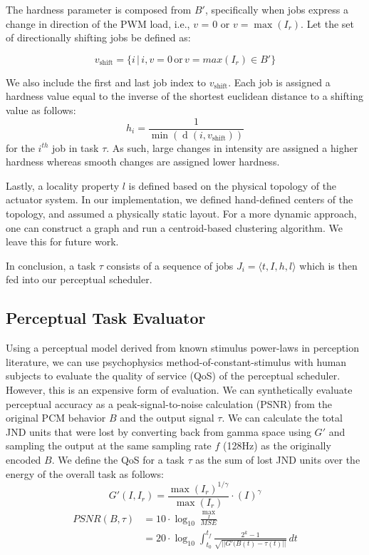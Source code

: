 \documentclass{sigchi}
\DeclareMathOperator{\dis}{d}
\begin{document}
    The hardness parameter is composed from $B'$, specifically when jobs express a change in direction of the PWM load, i.e., $v$ = 0 or $v = \max(I_r)$. Let the set of directionally shifting jobs be defined as:

    $$v_\text{shift} = \{ i \,\vert \,i, v = 0 \,\text{or} \, v = max(I_r) \in B'\}$$ 

    We also include the first and last job index to $v_\text{shift}$. Each job is assigned a hardness value equal to the inverse of the shortest euclidean distance to a shifting value as follows:
    $$ h_{i} = \frac{1}{\min (\dis(i, v_\text{shift} ))}$$ 
    for the $i^{th}$ job in task $\tau$. As such, large changes in intensity are assigned a higher hardness whereas smooth changes are assigned lower hardness. 

    Lastly, a locality property $l$ is defined based on the physical topology of the actuator system. In our implementation, we defined hand-defined centers of the topology, and assumed a physically static layout. For a more dynamic approach, one can construct a graph and run a centroid-based clustering algorithm. We leave this for future work.  
  
  In conclusion, a task $\tau$ consists of a sequence of jobs $J_i = \langle t, I, h, l \rangle$ which is then fed into our perceptual scheduler. 

  \subsection{Perceptual Task Evaluator}
  Using a perceptual model derived from known stimulus power-laws in perception literature, we can use psychophysics method-of-constant-stimulus with human subjects to evaluate the quality of service (QoS) of the perceptual scheduler. However, this is an expensive form of evaluation. 
  We can synthetically evaluate perceptual accuracy as a peak-signal-to-noise calculation (PSNR) from the original PCM behavior $B$ and the output signal $\tau$. We can calculate the total JND units that were lost by converting back from gamma space using $G'$ and sampling the output at the same sampling rate $f$ (128Hz) as the originally encoded $B$. We define the QoS for a task $\tau$ as the sum of lost JND units over the energy of the overall task as follows:
  $$G'(I, I_r) = \frac{\max(I_r)^{1/\gamma}}{\max(I_r)} \cdot (I)^\gamma $$
  \begin{align}
  PSNR(B, \tau) &= 10 \cdot \log_{10} \frac{\max_I}{MSE}\\
  &= 20 \cdot \log_{10} \int_{t_0}^{t_f} \frac{2^k-1}{\sqrt{\lvert\lvert G'(B(t) - \tau(t) \rvert\rvert}}  \, dt
  \label{eq:error}
  \end{align}
\end{document}
